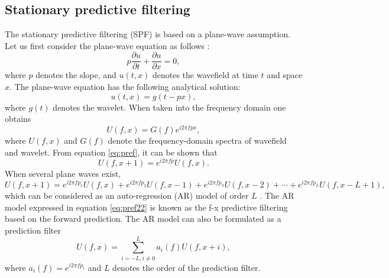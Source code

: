 \subsection{Stationary predictive filtering}
The stationary predictive filtering (SPF) is based on a plane-wave assumption. Let us first consider the plane-wave equation as follows \cite[]{fomel2002pwd}:
\begin{equation}
\label{eq:plane}
p \frac{\partial u}{\partial t} + \frac{\partial u}{\partial x} = 0,
\end{equation}
where $p$ denotes the slope, and $u(t,x)$ denotes the wavefield at time $t$ and space $x$. The plane-wave equation has the following analytical solution:
\begin{equation}
\label{eq:pre}
u(t,x)=g(t-px),
\end{equation}
where $g(t)$ denotes the wavelet.  When taken into the frequency domain one obtains
\begin{equation}
\label{eq:pref}
U(f,x)=G(f)e^{i2\pi fpx},
\end{equation}
where $U(f,x)$ and $G(f)$ denote the frequency-domain spectra of wavefield and wavelet. From equation \ref{eq:pref}, it can be shown that
\begin{equation}
\label{eq:pref2}
U(f,x+1)=e^{i2\pi fp}U(f,x).
\end{equation}
When several plane waves exist, 
\begin{equation}
\label{eq:pref22}
U(f,x+1)=e^{i2\pi fp_1}U(f,x)+e^{i2\pi fp_2}U(f,x-1)+e^{i2\pi fp_3}U(f,x-2)+\cdots+e^{i2\pi fp_{L}}U(f,x-L+1),
\end{equation}
which can be considered as an auto-regression (AR) model of order $L$ \cite[]{tufts1980,canales1984,yangkang20141}. The AR model expressed in equation \ref{eq:pref22} is known as the f-x predictive filtering based on the forward prediction. The AR model can also be formulated as a  prediction filter
\begin{equation}
\label{eq:pref22causal}
U(f,x)=\sum_{i=-L,i\ne 0}^{L}a_i(f)U(f,x+i),
\end{equation}
where $a_i(f)=e^{i2\pi fp_i}$ and $L$ denotes the order of the  prediction filter. 

